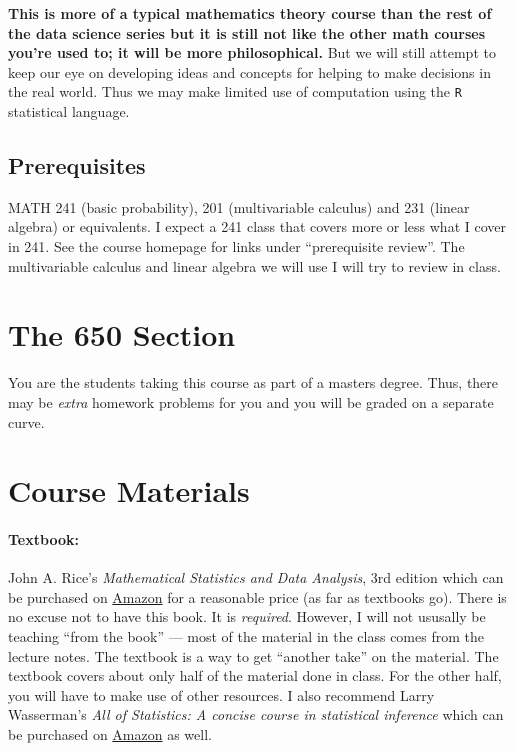 \documentclass[12pt]{article}
\newcommand{\qu}[1]{``#1''}
\begin{document}
\textbf{This is more of a typical mathematics theory course than the rest of the data science series but it is still not like the other math courses you're used to; it will be more philosophical.} But we will still attempt to keep our eye on developing ideas and concepts for helping to make decisions in the real world. Thus we may make limited use of computation using the \texttt{R} statistical language.

\subsection*{Prerequisites}

MATH 241 (basic probability), 201 (multivariable calculus) and 231 (linear algebra) or equivalents. I expect a 241 class that covers more or less what I cover in 241. See the course homepage for links under \qu{prerequisite review}. The multivariable calculus and linear algebra we will use I will try to review in class.


\section*{The 650 Section}

You are the students taking this course as part of a masters degree. Thus, there may be \textit{extra} homework problems for you and you will be graded on a separate curve.

\section*{Course Materials}

\paragraph{Textbook:} John A. Rice's \emph{Mathematical Statistics and Data Analysis}, 3rd edition which can be purchased on \href{https://www.amazon.com/dp/0534399428}{Amazon} for a reasonable price (as far as textbooks go). There is no excuse not to have this book. It is \textit{required}. However, I will not ususally be teaching \qu{from the book} --- most of the material in the class comes from the lecture notes. The textbook is a way to get ``another take'' on the material. The textbook covers about only half of the material done in class. For the other half, you will have to make use of other resources. I also recommend Larry Wasserman's \emph{All of Statistics: A concise course in statistical inference} which can be purchased on \href{https://www.amazon.com/dp/0387402721}{Amazon} as well.
\end{document}
